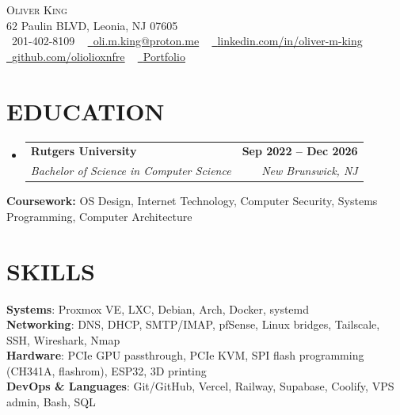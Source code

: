 \documentclass[letterpaper,11pt]{article}
\makeatletter
\newcommand{\resumeSubheading}[4]{
  \vspace{-2pt}\item
    \begin{tabular*}{1.0\textwidth}[t]{l@{\extracolsep{\fill}}r}
      \textbf{#1} & \textbf{\small #2} \\
      \textit{\small#3} & \textit{\small #4} \\
    \end{tabular*}\vspace{-7pt}
}
\newcommand{\resumeSubHeadingListStart}{\begin{itemize}[leftmargin=0.0in, label={}]}
\newcommand{\resumeSubHeadingListEnd}{\end{itemize}}
\makeatother
\begin{document}

\begin{center}
    {\Huge \scshape Oliver King} \\ \vspace{1pt}
    62 Paulin BLVD, Leonia, NJ 07605 \\ \vspace{1pt}
    \small \raisebox{-0.1\height}\faPhone\ 201-402-8109 ~ \href{mailto:oli.m.king@proton.me}{\raisebox{-0.2\height}\faEnvelope\  \underline{oli.m.king@proton.me}} ~
    \href{https://linkedin.com/in/oliver-m-king/}{\raisebox{-0.2\height}\faLinkedin\ \underline{linkedin.com/in/oliver-m-king}}  ~
    \href{https://github.com/oliolioxnfre}{\raisebox{-0.2\height}\faGithub\ \underline{github.com/oliolioxnfre}}  ~
    \href{https://oliolioxnfre.github.io/portfolio/}{\raisebox{-0.2\height}\faBriefcase\ \underline{Portfolio}}
    \vspace{-8pt}

\end{center}


\section{EDUCATION}
  \resumeSubHeadingListStart
 \resumeSubheading
      {Rutgers University}{Sep 2022 -- Dec 2026}
      {Bachelor of Science in Computer Science} {New Brunswick, NJ}
  \resumeSubHeadingListEnd
  \vspace{-6pt}
  {\small \textbf{Coursework:} OS Design, Internet Technology, Computer Security, Systems Programming, Computer Architecture}
\vspace{-6pt}


\section{SKILLS}
 \begin{itemize}[leftmargin=0in, label={}]
    \small{\item{
     \textbf{Systems}{: Proxmox VE, LXC, Debian, Arch, Docker, systemd} \\
     \textbf{Networking}{: DNS, DHCP, SMTP/IMAP, pfSense, Linux bridges, Tailscale, SSH, Wireshark, Nmap} \\
     \textbf{Hardware}{: PCIe GPU passthrough, PCIe KVM, SPI flash programming (CH341A, flashrom), ESP32, 3D printing} \\
     \textbf{DevOps \& Languages}{: Git/GitHub, Vercel, Railway, Supabase, Coolify, VPS admin, Bash, SQL}
    }}
 \end{itemize}
 \vspace{-16pt}
\end{document}

